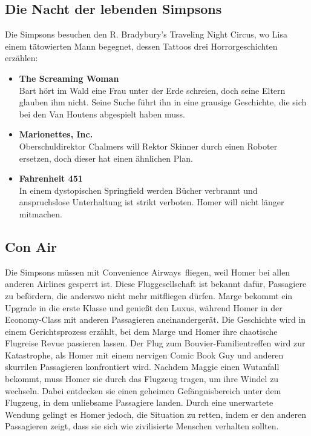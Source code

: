 \subsection{Die Nacht der lebenden Simpsons}
Die Simpsons besuchen den \glqq R. Bradybury's Traveling Night Circus\grqq, wo Lisa einem tätowierten Mann begegnet, dessen Tattoos drei Horrorgeschichten erzählen:
\begin{itemize}
	\item \textbf{The Screaming Woman}\\
	Bart hört im Wald eine Frau unter der Erde schreien, doch seine Eltern glauben ihm nicht. Seine Suche führt ihn in eine grausige Geschichte, die sich bei den Van Houtens abgespielt haben muss.
	\item \textbf{Marionettes, Inc.}\\
	Oberschuldirektor Chalmers will Rektor Skinner durch einen Roboter ersetzen, doch dieser hat einen ähnlichen Plan.
	\item \textbf{Fahrenheit 451}\\
	In einem dystopischen Springfield werden Bücher verbrannt und anspruchslose Unterhaltung ist strikt verboten. Homer will nicht länger mitmachen.
\end{itemize}

\subsection{Con Air}
Die Simpsons müssen mit \glqq Convenience Airways\grqq\ fliegen, weil Homer bei allen anderen Airlines gesperrt ist. Diese Fluggesellschaft ist bekannt dafür, Passagiere zu befördern, die anderswo nicht mehr mitfliegen dürfen. Marge bekommt ein Upgrade in die erste Klasse und genießt den Luxus, während Homer in der Economy-Class mit anderen Passagieren aneinandergerät. Die Geschichte wird in einem Gerichtsprozess erzählt, bei dem Marge und Homer ihre chaotische Flugreise Revue passieren lassen. Der Flug zum Bouvier-Familientreffen wird zur Katastrophe, als Homer mit einem nervigen Comic Book Guy und anderen skurrilen Passagieren konfrontiert wird. Nachdem Maggie einen Wutanfall bekommt, muss Homer sie durch das Flugzeug tragen, um ihre Windel zu wechseln. Dabei entdecken sie einen geheimen Gefängnisbereich unter dem Flugzeug, in dem unliebsame Passagiere landen. Durch eine unerwartete Wendung gelingt es Homer jedoch, die Situation zu retten, indem er den anderen Passagieren zeigt, dass sie sich wie zivilisierte Menschen verhalten sollten.

